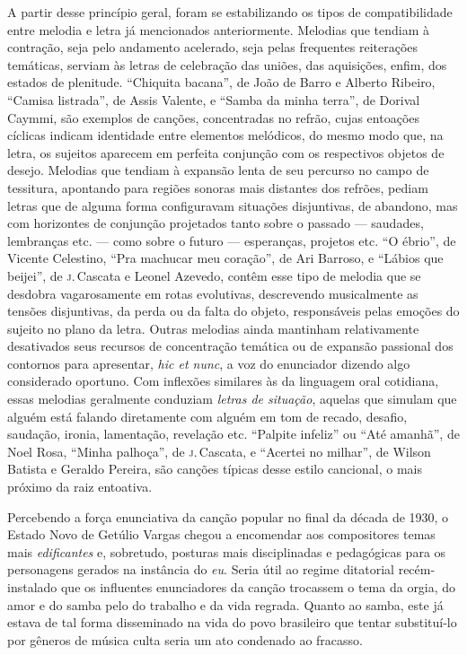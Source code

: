 A partir desse princípio geral, foram se estabilizando os tipos de
compatibilidade entre melodia e letra já mencionados anteriormente.
Melodias que tendiam à contração, seja pelo andamento acelerado, seja
pelas frequentes reiterações temáticas, serviam às letras de celebração
das uniões, das aquisições, enfim, dos estados de plenitude. ``Chiquita
bacana'', de João de Barro e Alberto Ribeiro, ``Camisa listrada'', de Assis
Valente, e ``Samba da minha terra'', de Dorival Caymmi, são exemplos de
canções, concentradas no refrão, cujas entoações cíclicas indicam
identidade entre elementos melódicos, do mesmo modo que, na letra, os
sujeitos aparecem em perfeita conjunção com os respectivos objetos de
desejo. Melodias que tendiam à expansão lenta de seu percurso no campo
de tessitura, apontando para regiões sonoras mais distantes dos refrões,
pediam letras que de alguma forma configuravam situações disjuntivas, de
abandono, mas com horizontes de conjunção projetados tanto sobre o
passado --- saudades, lembranças etc. --- como sobre o futuro --- esperanças,
projetos etc. ``O ébrio'', de Vicente Celestino, ``Pra machucar meu
coração'', de Ari Barroso, e ``Lábios que beijei'', de \textsc{j}.\,Cascata e Leonel
Azevedo, contêm esse tipo de melodia que se desdobra vagarosamente em
rotas evolutivas, descrevendo musicalmente as tensões disjuntivas, da
perda ou da falta do objeto, responsáveis pelas emoções do sujeito no
plano da letra. Outras melodias ainda mantinham relativamente
desativados seus recursos de concentração temática ou de expansão
passional dos contornos para apresentar, \textit{hic et nunc}, a voz do
enunciador dizendo algo considerado oportuno. Com inflexões similares às
da linguagem oral cotidiana, essas melodias geralmente conduziam
\textit{letras de situação}, aquelas que simulam que alguém está falando
diretamente com alguém em tom de recado, desafio, saudação, ironia,
lamentação, revelação etc. ``Palpite infeliz'' ou ``Até amanhã'', de Noel
Rosa, ``Minha palhoça'', de \textsc{j}.\,Cascata, e ``Acertei no milhar'', de Wilson
Batista e Geraldo Pereira, são canções típicas desse estilo cancional, o
mais próximo da raiz entoativa.

Percebendo a força enunciativa da canção popular no final da década de
1930, o Estado Novo de Getúlio Vargas chegou a encomendar aos
compositores temas mais \textit{edificantes} e, sobretudo, posturas mais
disciplinadas e pedagógicas para os personagens gerados na instância do
\textit{eu}. Seria útil ao regime ditatorial recém-instalado que os
influentes enunciadores da canção trocassem o tema da orgia, do amor e
do samba pelo do trabalho e da vida regrada. Quanto ao samba, este já
estava de tal forma disseminado na vida do povo brasileiro que tentar
substituí-lo por gêneros de música culta seria um ato condenado ao
fracasso.

